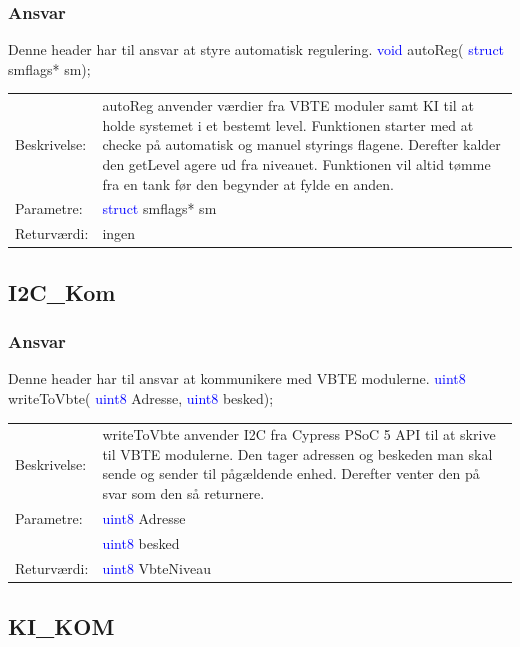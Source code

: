 \subsubsection{Ansvar}
Denne header har til ansvar at styre automatisk regulering.
\textcolor{blue}{void} autoReg( \textcolor{blue}{struct} smflags* sm); 
\begin{table}[H]
\begin{tabular}{l p{12.5cm}}
\hline
Beskrivelse:& autoReg anvender værdier fra VBTE moduler samt KI til at holde systemet i et bestemt level. Funktionen starter med at checke på automatisk og manuel styrings flagene. Derefter kalder den getLevel agere ud fra niveauet. Funktionen vil altid tømme fra en tank før den begynder at fylde en anden.\\
Parametre:&\textcolor{blue}{struct} smflags* sm\\
Returværdi:&ingen\\
\end{tabular}
\end{table}
\subsection{I2C\_Kom}
\subsubsection{Ansvar}
Denne header har til ansvar at kommunikere med VBTE modulerne.
\textcolor{blue}{uint8} writeToVbte( \textcolor{blue}{uint8} Adresse, \textcolor{blue}{uint8} besked); 
\begin{table}[H]
\begin{tabular}{l p{12.5cm}}
\hline
Beskrivelse:& writeToVbte anvender I2C fra Cypress PSoC 5 API til at skrive til VBTE modulerne. Den tager adressen og beskeden man skal sende og sender til pågældende enhed. Derefter venter den på svar som den så returnere. \\
Parametre:&\textcolor{blue}{uint8} Adresse\\
 &\textcolor{blue}{uint8} besked\\
Returværdi:&\textcolor{blue}{uint8} VbteNiveau\\
\end{tabular}
\end{table}
\subsection{KI\_KOM}
